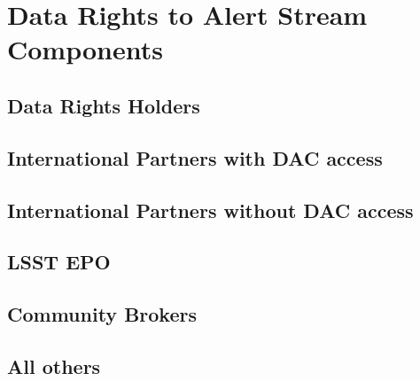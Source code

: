 \section{Data Rights to Alert Stream Components}



\subsection{Data Rights Holders}
\subsection{International Partners with DAC access}
\subsection{International Partners without DAC access}
\subsection{LSST EPO}


\subsection{Community Brokers}



\subsection{All others}
